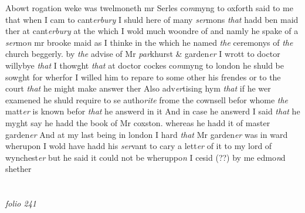 \documentclass[12pt, a4paper]{book}
\begin{document}
Abowt rogation weke was twelmoneth mr Serles co\textit{m}myng to oxforth said to me that when I cam to cant\textit{erbury} I shuld here of many \textit{ser}mons \textit{that} hadd ben maid ther at cant\textit{erbury} at the which I wold much woondre of and namly he spake of a \textit{ser}mo\textit{n} mr brooke maid as I thinke in the which he named \textit{the} ceremonys of \textit{the} church beggerly. by \textit{the} advise of Mr \textit{par}khurst \& garden\textit{er} I wrott to doctor willybye \textit{that} I thowght \textit{that} at doctor cockes co\textit{m}myng to london he shuld be sowght for wherfor I willed him to repare to some other his frendes or to the court \textit{that} he might make answer ther Also adv\textit{er}tising hym \textit{that} if he wer examened he shuld require to se autho\textit{rite} frome the cownsell befor whome \textit{the} matt\textit{er} is known befor \textit{that} he answerd in it And in case he answerd I said \textit{that} he myght say he hadd the book of Mr coxston. whereas he hadd it of  master garden\textit{er} And at my last being in london I hard \textit{that} Mr garden\textit{er} was in ward wherupon I wold have hadd his \textit{ser}vant to cary a lett\textit{er} of it to my  lord of wynchest\textit{er} but he said it could not be wheruppo\textit{n} I cesid (??)  by me edmo\textit{n}d shether

\dotfill
					  \section*{}  \subsection*{}

\textit{folio 241}
\end{document}
